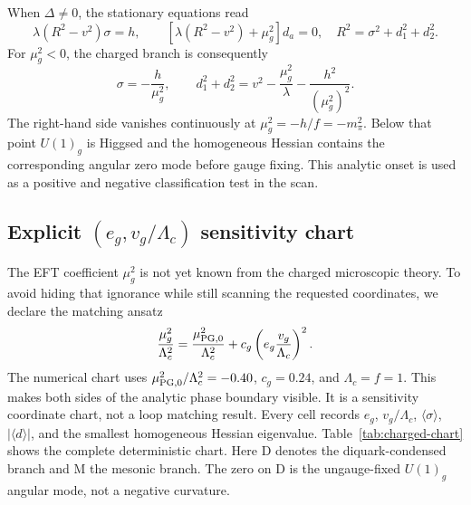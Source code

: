 \documentclass[11pt]{article}
\theoremstyle{definition}
\theoremstyle{remark}
\begin{document}
When \(\Delta\ne0\), the stationary equations read
\begin{equation}
 \lambda(R^2-v^2)\sigma=h,\qquad
 [\lambda(R^2-v^2)+\mu_g^2]d_a=0,
 \quad R^2=\sigma^2+d_1^2+d_2^2.
\end{equation}
For \(\mu_g^2<0\), the charged branch is consequently
\begin{equation}
 \sigma=-\frac{h}{\mu_g^2},\qquad
 d_1^2+d_2^2=v^2-\frac{\mu_g^2}{\lambda}
 -\frac{h^2}{(\mu_g^2)^2}.
 \label{eq:condensed-branch}
\end{equation}
The right-hand side vanishes continuously at
\(\mu_g^2=-h/f=-m_\pi^2\).  Below that point \(U(1)_g\) is Higgsed and the
homogeneous Hessian contains the corresponding angular zero mode before
gauge fixing.  This analytic onset is used as a positive and negative
classification test in the scan.

\subsection{Explicit
\texorpdfstring{\((e_g,v_g/\Lambda_c)\)}{(eg, vg/Lambda-c)}
sensitivity chart}

The EFT coefficient \(\mu_g^2\) is not yet known from the charged microscopic
theory.  To avoid hiding that ignorance while still scanning the requested
coordinates, we declare the matching ansatz
\begin{equation}
 \frac{\mu_g^2}{\Lambda_c^2}
 =\frac{\mu_{\rm PG,0}^2}{\Lambda_c^2}
 +c_g\left(e_g\frac{v_g}{\Lambda_c}\right)^2.
 \label{eq:matching-ansatz}
\end{equation}
The numerical chart uses
\(\mu_{\rm PG,0}^2/\Lambda_c^2=-0.40\), \(c_g=0.24\), and
\(\Lambda_c=f=1\).  This makes both sides of the analytic phase boundary
visible.  It is a sensitivity coordinate chart, not a loop matching result.
Every cell records \(e_g\), \(v_g/\Lambda_c\), \(\langle\sigma\rangle\),
\(|\langle d\rangle|\), and the smallest homogeneous Hessian eigenvalue.
Table~\ref{tab:charged-chart} shows the complete deterministic chart.
Here D denotes the diquark-condensed branch and M the mesonic branch.
The zero on D is the ungauge-fixed \(U(1)_g\) angular mode, not a negative
curvature.
\end{document}
